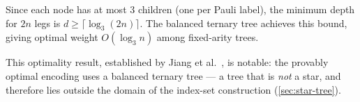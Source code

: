 \begin{corollary}
\label{cor:optimal-weight}
Since each node has at most 3 children (one per Pauli label), the
minimum depth for $2n$ legs is $d \ge \lceil\log_3(2n)\rceil$.
The balanced ternary tree achieves this bound, giving optimal weight
$O(\log_3 n)$ among fixed-arity trees.
\end{corollary}

This optimality result, established by Jiang et al.~\cite{jiang2020},
is notable: the provably optimal encoding uses a balanced ternary tree
--- a tree that is \emph{not} a star, and therefore lies outside the
domain of the index-set construction (\cref{sec:star-tree}).
